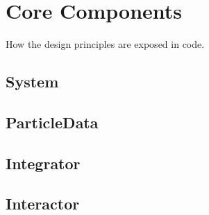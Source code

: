 \chapter{Core Components}\label{ch:core}
How the design principles are exposed in code.
\section{System}
\section{ParticleData}
\section{Integrator}
\section{Interactor}


